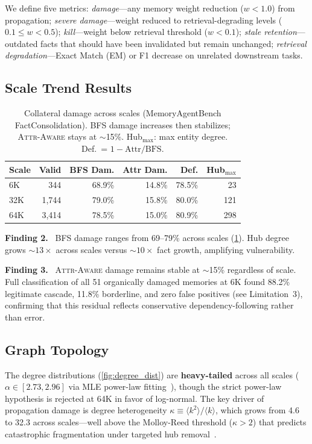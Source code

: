 \documentclass{article}
\newcommand{\attraware}{\textsc{Attr-Aware}}
\newcommand{\finding}[1]{\vspace{2pt}\noindent\textbf{Finding #1.}~}
\begin{document}
We define five metrics:
\textit{damage}---any memory weight reduction ($w < 1.0$) from propagation;
\textit{severe damage}---weight reduced to retrieval-degrading levels ($0.1 \leq w < 0.5$);
\textit{kill}---weight below retrieval threshold ($w < 0.1$);
\textit{stale retention}---outdated facts that should have been invalidated but remain unchanged;
\textit{retrieval degradation}---Exact Match (EM) or F1 decrease on unrelated downstream tasks.

\subsection{Scale Trend Results}

\begin{table}[htbp]
\centering
\footnotesize
\begin{tabular}{lrrrrr}
\toprule
\textbf{Scale} & \textbf{Valid} & \textbf{BFS Dam.} & \textbf{Attr Dam.} & \textbf{Def.} & \textbf{Hub$_{\max}$} \\
\midrule
6K   & 344   & 68.9\% & 14.8\% & 78.5\% & 23 \\
32K  & 1,744 & 79.0\% & 15.8\% & 80.0\% & 121 \\
64K  & 3,414 & 78.5\% & 15.0\% & 80.9\% & 298 \\
\bottomrule
\end{tabular}
\caption{Collateral damage across scales (MemoryAgentBench FactConsolidation). BFS damage increases then stabilizes; \attraware{} stays at ${\sim}$15\%. Hub$_{\max}$: max entity degree. Def.\ = $1 - \text{Attr}/\text{BFS}$.}
\label{tab:scale}
\end{table}

\finding{2} BFS damage ranges from 69--79\% across scales (\cref{tab:scale}).
Hub degree grows ${\sim}13\times$ across scales versus ${\sim}10\times$ fact growth, amplifying vulnerability.

\finding{3} \attraware{} damage remains stable at ${\sim}$15\% regardless of scale.
Full classification of all 51 organically damaged memories at 6K found 88.2\% legitimate cascade, 11.8\% borderline, and zero false positives (see Limitation~3), confirming that this residual reflects conservative dependency-following rather than error.

\subsection{Graph Topology}

The degree distributions (\cref{fig:degree_dist}) are \textbf{heavy-tailed} across all scales ($\alpha \in [2.73, 2.96]$ via MLE power-law fitting~\citep{clauset_powerlaw_2009}), though the strict power-law hypothesis is rejected at 64K in favor of log-normal.
The key driver of propagation damage is degree heterogeneity $\kappa \equiv \langle k^2 \rangle / \langle k \rangle$, which grows from 4.6 to 32.3 across scales---well above the Molloy-Reed threshold ($\kappa > 2$) that predicts catastrophic fragmentation under targeted hub removal~\citep{molloy_reed_1995, albert_attack_2000, cohen_percolation_2000}.
\end{document}
